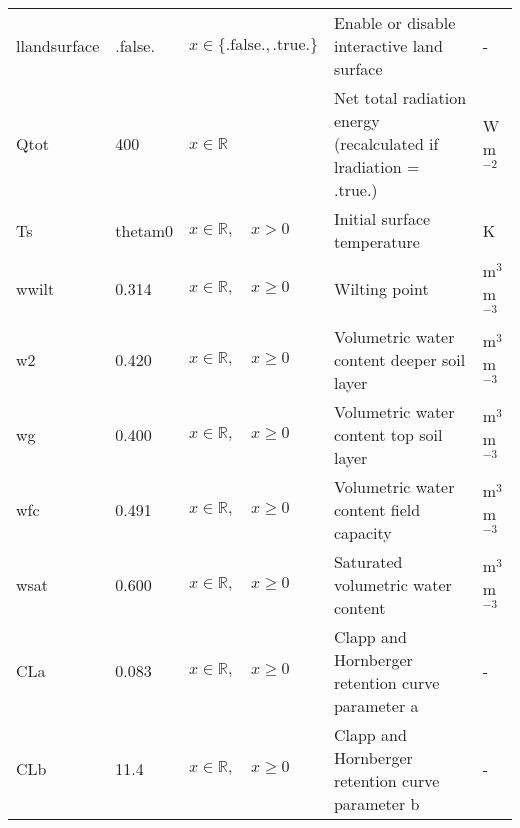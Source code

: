 \documentclass[twoside,11pt,fleqn,a4paper,english,openright]{report}
\begin{document}
\begin{center}
  \tablelasttail{
        &&&&\\\hline
  }
\begin{supertabular}{|l|p{1.6cm}|p{4cm}|p{6.3cm}|l|}
  llandsurface	&	.false.	&	$x\in\{\text{.false.},\text{.true.}\}$	& Enable or disable interactive land surface	& -\\
  Qtot		&	400	&	$x \in \mathbb{R}$		& Net total radiation energy (recalculated if lradiation = .true.) 	&	W m$^{-2}$\\
  Ts        &   thetam0 & $x \in \mathbb{R}, \quad x > 0$ & Initial surface temperature & K\\
  wwilt		&   0.314 &	$x \in \mathbb{R}, \quad x \geq 0$ & Wilting point	& m$^3$ m$^{-3}$\\
  w2		&   0.420 &	$x \in \mathbb{R}, \quad x \geq 0$ & Volumetric water content deeper soil layer	& m$^3$ m$^{-3}$\\
  wg		&   0.400 &	$x \in \mathbb{R}, \quad x \geq 0$ & Volumetric water content top soil layer	& m$^3$ m$^{-3}$\\
  wfc		&   0.491 &	$x \in \mathbb{R}, \quad x \geq 0$ & Volumetric water content field capacity	& m$^3$ m$^{-3}$\\
  wsat		&   0.600 &	$x \in \mathbb{R}, \quad x \geq 0$ & Saturated volumetric water content	& m$^3$ m$^{-3}$\\
  CLa		& 0.083	& $x \in \mathbb{R}, \quad x \geq 0$ & Clapp and Hornberger retention curve parameter a & -\\
  CLb		& 11.4	& $x \in \mathbb{R}, \quad x \geq 0$ & Clapp and Hornberger retention curve parameter b & -\\

\end{supertabular}
\end{center}
\end{document}

